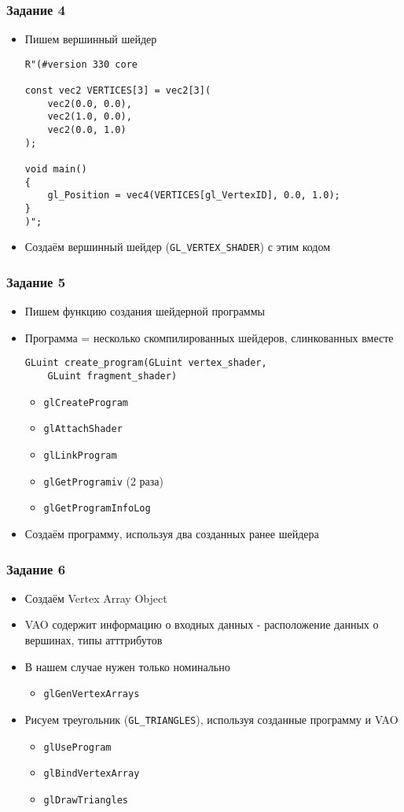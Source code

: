 \documentclass{beamer}
\begin{document}
\begin{frame}[fragile]
\frametitle{Задание 4}
\begin{itemize}
\item Пишем вершинный шейдер
\pause
\begin{verbatim}
R"(#version 330 core

const vec2 VERTICES[3] = vec2[3](
    vec2(0.0, 0.0),
    vec2(1.0, 0.0),
    vec2(0.0, 1.0)
);

void main()
{
    gl_Position = vec4(VERTICES[gl_VertexID], 0.0, 1.0);
}
)";
\end{verbatim}
\pause
\item Создаём вершинный шейдер (\verb|GL_VERTEX_SHADER|) с этим кодом
\end{itemize}
\end{frame}

\begin{frame}[fragile]
\frametitle{Задание 5}
\begin{itemize}
\item Пишем функцию создания шейдерной программы
\item Программа = несколько скомпилированных шейдеров, слинкованных вместе
\begin{verbatim}
GLuint create_program(GLuint vertex_shader,
    GLuint fragment_shader)
\end{verbatim}
\pause
\begin{itemize}
\item \verb|glCreateProgram|
\item \verb|glAttachShader|
\item \verb|glLinkProgram|
\item \verb|glGetProgramiv| (2 раза)
\item \verb|glGetProgramInfoLog|
\end{itemize}
\pause
\item Создаём программу, используя два созданных ранее шейдера
\end{itemize}
\end{frame}

\begin{frame}[fragile]
\frametitle{Задание 6}
\begin{itemize}
\item Создаём Vertex Array Object
\item VAO содержит информацию о входных данных - расположение данных о вершинах, типы атттрибутов
\item В нашем случае нужен только номинально
\pause
\begin{itemize}
\item \verb|glGenVertexArrays|
\end{itemize}
\pause
\item Рисуем треугольник (\verb|GL_TRIANGLES|), используя созданные программу и VAO
\pause
\begin{itemize}
\item \verb|glUseProgram|
\item \verb|glBindVertexArray|
\item \verb|glDrawTriangles|
\end{itemize}
\end{itemize}
\end{frame}
\end{document}
